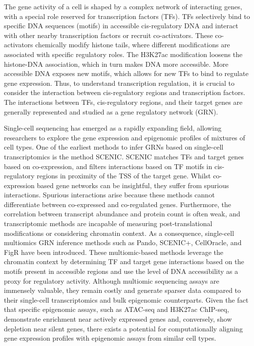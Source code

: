 The gene activity of a cell is shaped by a complex network of interacting genes, with a special role reserved for transcription factors (TFs). TFs selectively bind to specific DNA sequences (motifs) in accessible cis-regulatory DNA and interact with other nearby transcription factors or recruit co-activators\cite{Spitz2012}. These co-activators chemically modify histone tails, where different modifications are associated with specific regulatory roles. The H3K27ac modification loosens the histone-DNA association, which in turn makes DNA more accessible\cite{Creyghton2010}. More accessible DNA exposes new motifs, which allows for new TFs to bind to regulate gene expression\cite{Tsompana2014}. Thus, to understand transcription regulation, it is crucial to consider the interaction between cis-regulatory regions and transcription factors\cite{Xu_2020,Kamal_2021,Gonz_lez_Blas_2022,Fleck2022,Kamimoto2023,Kartha2022}. The interactions between TFs, cis-regulatory regions, and their target genes are generally represented and studied as a gene regulatory network (GRN).

Single-cell sequencing has emerged as a rapidly expanding field, allowing researchers to explore the gene expression and epigenomic profiles of mixtures of cell types. One of the earliest methods to infer GRNs based on single-cell transcriptomics is the method SCENIC\cite{Aibar_2017}. SCENIC matches TFs and target genes based on co-expression, and filters interactions based on TF motifs in cis-regulatory regions in proximity of the TSS of the target gene. Whilst co-expression based gene networks can be insightful, they suffer from spurious interactions. Spurious interactions arise because these methods cannot differentiate between co-expressed and co-regulated genes\cite{vanderSande2021}. Furthermore, the correlation between transcript abundance and protein count is often weak\cite{Fortelny2017,Franks2017}, and transcriptomic methods are incapable of measuring post-translational modifications or considering chromatin context. As a consequence, single-cell multiomics GRN inference methods such as Pando\cite{Fleck2022}, SCENIC+\cite{Gonz_lez_Blas_2022}, CellOracle\cite{Kamimoto2023}, and FigR\cite{Kartha2022} have been introduced. These multiomic-based methods leverage the chromatin context by determining TF and target gene interactions based on the motifs present in accessible regions and use the level of DNA accessibility as a proxy for regulatory activity. Although multiomic sequencing assays are immensely valuable, they remain costly and generate sparser data compared to their single-cell transcriptomics and bulk epigenomic counterparts\cite{Li2021}. Given the fact that specific epigenomic assays, such as ATAC-seq and H3K27ac ChIP-seq, demonstrate enrichment near actively expressed genes\cite{Wang2016,GonzlezRamrez2021} and, conversely, show depletion near silent genes, there exists a potential for computationally aligning gene expression profiles with epigenomic assays from similar cell types.

